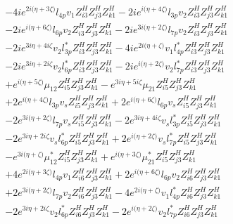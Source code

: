 \begin{align}
 &-4 i e^{2 i \Big(\eta +3 \zeta \Big)} l_{4p} v_1 Z_{{i 3}}^{H} Z_{{j 3}}^{H} Z_{{k 1}}^{H} -2 i e^{i \Big(\eta +4 \zeta \Big)} l_{3p} v_2 Z_{{i 3}}^{H} Z_{{j 3}}^{H} Z_{{k 1}}^{H} \nonumber \\ 
 &-2 i e^{i \Big(\eta +6 \zeta \Big)} l_{6p} v_2 Z_{{i 3}}^{H} Z_{{j 3}}^{H} Z_{{k 1}}^{H} -2 i e^{3 i \Big(\eta +2 \zeta \Big)} l_{7p} v_2 Z_{{i 3}}^{H} Z_{{j 3}}^{H} Z_{{k 1}}^{H} \nonumber \\ 
 &-2 i e^{3 i \eta +4 i \zeta } v_2 l_{3p}^* Z_{{i 3}}^{H} Z_{{j 3}}^{H} Z_{{k 1}}^{H} -4 i e^{2 i \Big(\eta +\zeta \Big)} v_1 l_{4p}^* Z_{{i 3}}^{H} Z_{{j 3}}^{H} Z_{{k 1}}^{H} \nonumber \\ 
 &-2 i e^{3 i \eta +2 i \zeta } v_2 l_{6p}^* Z_{{i 3}}^{H} Z_{{j 3}}^{H} Z_{{k 1}}^{H} -2 i e^{i \Big(\eta +2 \zeta \Big)} v_2 l_{7p}^* Z_{{i 3}}^{H} Z_{{j 3}}^{H} Z_{{k 1}}^{H} \nonumber \\ 
 &+e^{i \Big(\eta +5 \zeta \Big)} \mu_{12} Z_{{i 5}}^{H} Z_{{j 3}}^{H} Z_{{k 1}}^{H} - e^{3 i \eta +5 i \zeta } \mu_{21} Z_{{i 5}}^{H} Z_{{j 3}}^{H} Z_{{k 1}}^{H} \nonumber \\ 
 &+2 e^{i \Big(\eta +4 \zeta \Big)} l_{3p} v_s Z_{{i 5}}^{H} Z_{{j 3}}^{H} Z_{{k 1}}^{H} +2 e^{i \Big(\eta +6 \zeta \Big)} l_{6p} v_s Z_{{i 5}}^{H} Z_{{j 3}}^{H} Z_{{k 1}}^{H} \nonumber \\ 
 &-2 e^{3 i \Big(\eta +2 \zeta \Big)} l_{7p} v_s Z_{{i 5}}^{H} Z_{{j 3}}^{H} Z_{{k 1}}^{H} -2 e^{3 i \eta +4 i \zeta } v_s l_{3p}^* Z_{{i 5}}^{H} Z_{{j 3}}^{H} Z_{{k 1}}^{H} \nonumber \\ 
 &-2 e^{3 i \eta +2 i \zeta } v_s l_{6p}^* Z_{{i 5}}^{H} Z_{{j 3}}^{H} Z_{{k 1}}^{H} +2 e^{i \Big(\eta +2 \zeta \Big)} v_s l_{7p}^* Z_{{i 5}}^{H} Z_{{j 3}}^{H} Z_{{k 1}}^{H} \nonumber \\ 
 &- e^{3 i \Big(\eta +\zeta \Big)} \mu_{12}^* Z_{{i 5}}^{H} Z_{{j 3}}^{H} Z_{{k 1}}^{H} +e^{i \Big(\eta +3 \zeta \Big)} \mu_{21}^* Z_{{i 5}}^{H} Z_{{j 3}}^{H} Z_{{k 1}}^{H} \nonumber \\ 
 &+4 e^{2 i \Big(\eta +3 \zeta \Big)} l_{4p} v_1 Z_{{i 6}}^{H} Z_{{j 3}}^{H} Z_{{k 1}}^{H} +2 e^{i \Big(\eta +6 \zeta \Big)} l_{6p} v_2 Z_{{i 6}}^{H} Z_{{j 3}}^{H} Z_{{k 1}}^{H} \nonumber \\ 
 &+2 e^{3 i \Big(\eta +2 \zeta \Big)} l_{7p} v_2 Z_{{i 6}}^{H} Z_{{j 3}}^{H} Z_{{k 1}}^{H} -4 e^{2 i \Big(\eta +\zeta \Big)} v_1 l_{4p}^* Z_{{i 6}}^{H} Z_{{j 3}}^{H} Z_{{k 1}}^{H} \nonumber \\ 
 &-2 e^{3 i \eta +2 i \zeta } v_2 l_{6p}^* Z_{{i 6}}^{H} Z_{{j 3}}^{H} Z_{{k 1}}^{H} -2 e^{i \Big(\eta +2 \zeta \Big)} v_2 l_{7p}^* Z_{{i 6}}^{H} Z_{{j 3}}^{H} Z_{{k 1}}^{H} \nonumber \\ 

\end{align}
